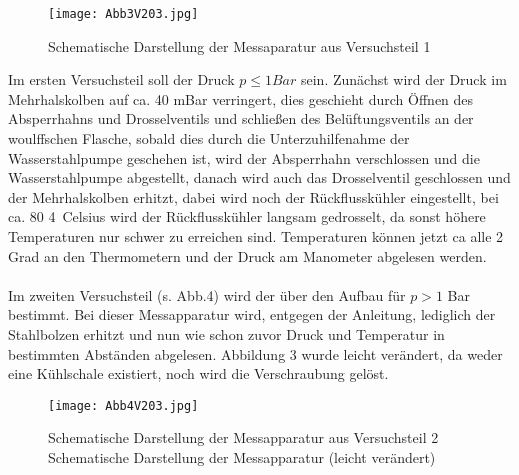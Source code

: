 \begin{wrapfigure}[16]{r}{0.4\textwidth}
        \texttt{[image: Abb3V203.jpg]}
        \caption{Schematische Darstellung der Messaparatur aus Versuchsteil 1}
        \label{fig:Abb3}
\end{wrapfigure}
Im ersten Versuchsteil soll der Druck $p \leq 1 Bar$ sein.
Zunächst wird der Druck im Mehrhalskolben auf ca. 40 mBar verringert, 
dies geschieht durch Öffnen des Absperrhahns und Drosselventils und schließen des Belüftungsventils 
an der woulffschen Flasche, sobald dies durch die Unterzuhilfenahme der Wasserstahlpumpe geschehen ist, 
wird der Absperrhahn verschlossen und die Wasserstahlpumpe abgestellt, danach wird auch das Drosselventil geschlossen 
und der Mehrhalskolben erhitzt, dabei wird noch der Rückflusskühler eingestellt, bei ca. 80 \SI{4}{Celsius} wird
der Rückflusskühler langsam gedrosselt, da sonst höhere Temperaturen nur schwer zu erreichen sind.
Temperaturen können jetzt ca alle 2 Grad an den Thermometern und der Druck am Manometer abgelesen werden. \\


\\ Im zweiten Versuchsteil (s. Abb.4) wird der über den Aufbau für 
$p > 1$ Bar bestimmt.
Bei dieser Messapparatur wird, entgegen der Anleitung, lediglich der Stahlbolzen erhitzt und nun wie schon zuvor Druck und Temperatur in bestimmten Abständen abgelesen.
Abbildung 3 wurde leicht verändert, da weder eine Kühlschale existiert, noch wird die Verschraubung gelöst. 
\begin{wrapfigure}[16]{r}{0.7\textwidth}
        \texttt{[image: Abb4V203.jpg]}
        \caption{Schematische Darstellung der Messapparatur aus Versuchsteil 2 Schematische Darstellung der Messapparatur (leicht verändert)}
        \label{fig:Abb4}
\end{wrapfigure}

